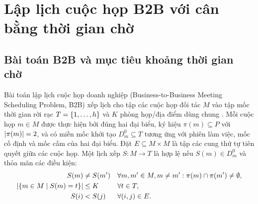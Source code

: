 \section{Lập lịch cuộc họp B2B với cân bằng thời gian chờ}


\subsection{Bài toán B2B và mục tiêu khoảng thời gian chờ}

Bài toán lập lịch cuộc họp doanh nghiệp (Business-to-Business Meeting Scheduling Problem, B2B) xếp lịch cho tập các cuộc họp đối tác \(M\) vào tập mốc thời gian rời rạc \(T=\left\{1,\ldots,h\right\}\) và \(K\) phòng họp/địa điểm dùng chung \parencite{pesant2015b2b,bofill2022b2b}. Mỗi cuộc họp \(m\in M\) được thực hiện bởi đúng hai đại biểu, ký hiệu \(\pi(m)\subseteq P\) với \(\lvert \pi(m)\rvert=2\), và có miền mốc khởi tạo \(D_m^0\subseteq T\) tương ứng với phiên làm việc, mốc cố định và mốc cấm của hai đại biểu. Đặt \(E\subseteq M\times M\) là tập các cung thứ tự tiên quyết giữa các cuộc họp. Một lịch xếp \(S: M\to T\) là hợp lệ nếu \(S(m)\in D_m^0\) và thỏa mãn các điều kiện:
\begin{align}
  S(m) &\ne S(m') && \forall m,m'\in M, m\ne m': \pi(m)\cap\pi(m')\ne\emptyset, \label{eq:b2b-participant}\\
  \lvert \left\{m\in M \;\middle|\; S(m)=t\right\}\rvert &\le K && \forall t\in T, \label{eq:b2b-capacity}\\
  S(i) &< S(j) && \forall (i,j)\in E. \label{eq:b2b-precedence}
\end{align}

